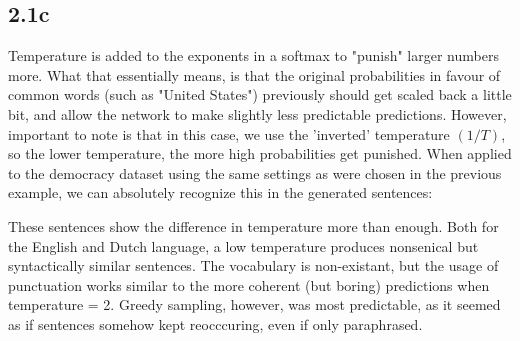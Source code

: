 \subsection*{2.1c}
Temperature is added to the exponents in a softmax to "punish" larger numbers more. 
What that essentially means, is that the original probabilities in favour of common words (such as "United States") previously
should get scaled back a little bit, and allow the network to make slightly less predictable predictions. However, important to note
is that in this case, we use the 'inverted' temperature $(1/T)$, so the lower temperature, the more high probabilities get punished.
When applied to the democracy dataset using the same settings as were chosen in the previous example, we can absolutely recognize this in the 
generated sentences:

\noindent{}

These sentences show the difference in temperature more than enough. Both for the English and Dutch language,
a low temperature produces nonsenical but syntactically similar sentences. The vocabulary is non-existant,
but the usage of punctuation works similar to the more coherent (but boring) predictions when temperature = 2. 
Greedy sampling, however, was most predictable, as it seemed as if sentences somehow kept reocccuring, even if only paraphrased.